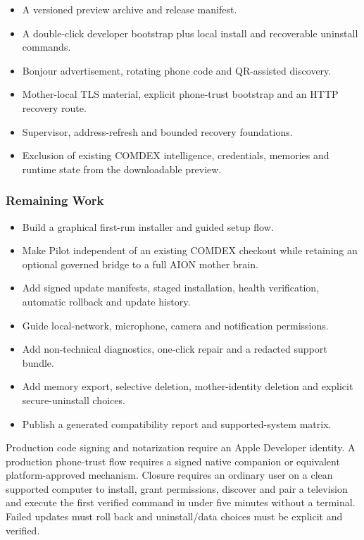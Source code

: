 \begin{itemize}
  \item A versioned preview archive and release manifest.
  \item A double-click developer bootstrap plus local install and recoverable
        uninstall commands.
  \item Bonjour advertisement, rotating phone code and QR-assisted discovery.
  \item Mother-local TLS material, explicit phone-trust bootstrap and an HTTP
        recovery route.
  \item Supervisor, address-refresh and bounded recovery foundations.
  \item Exclusion of existing COMDEX intelligence, credentials, memories and
        runtime state from the downloadable preview.
\end{itemize}

\subsubsection{Remaining Work}

\begin{itemize}
  \item Build a graphical first-run installer and guided setup flow.
  \item Make Pilot independent of an existing COMDEX checkout while retaining an
        optional governed bridge to a full AION mother brain.
  \item Add signed update manifests, staged installation, health verification,
        automatic rollback and update history.
  \item Guide local-network, microphone, camera and notification permissions.
  \item Add non-technical diagnostics, one-click repair and a redacted support bundle.
  \item Add memory export, selective deletion, mother-identity deletion and explicit
        secure-uninstall choices.
  \item Publish a generated compatibility report and supported-system matrix.
\end{itemize}

Production code signing and notarization require an Apple Developer identity. A
production phone-trust flow requires a signed native companion or equivalent
platform-approved mechanism. Closure requires an ordinary user on a clean supported
computer to install, grant permissions, discover and pair a television and execute
the first verified command in under five minutes without a terminal. Failed updates
must roll back and uninstall/data choices must be explicit and verified.

